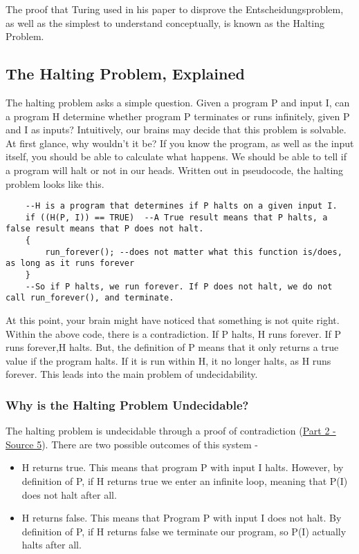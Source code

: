 \documentclass{article}
\begin{document}
    \medskip\noindent The proof that Turing used in his paper to disprove the Entscheidungsproblem, as well as the simplest to understand conceptually, is known as the Halting Problem. 
    
    \subsection{The Halting Problem, Explained}
    
    \medskip\noindent The halting problem asks a simple question. Given a program P and input I, can a program H determine whether program P terminates or runs infinitely, given P and I as inputs? Intuitively, our brains may decide that this problem is solvable. At first glance, why wouldn't it be? If you know the program, as well as the input itself, you should be able to calculate what happens. We should be able to tell if a program will halt or not in our heads. Written out in pseudocode, the halting problem looks like this.
    
    \begin{lstlisting}
    --H is a program that determines if P halts on a given input I. 
    if ((H(P, I)) == TRUE)  --A True result means that P halts, a false result means that P does not halt. 
    {
        run_forever(); --does not matter what this function is/does, as long as it runs forever 
    }
    --So if P halts, we run forever. If P does not halt, we do not call run_forever(), and terminate. 
    \end{lstlisting}
    
    \medskip\noindent At this point, your brain might have noticed that something is not quite right. Within the above code, there is a contradiction. If P halts, H runs forever. If P runs forever,H halts. But, the definition of P means that it only returns a true value if the program halts. If it is run within H, it no longer halts, as H runs forever. This leads into the main problem of undecidability. 
    
    \subsubsection{Why is the Halting Problem Undecidable?}
    The halting problem is undecidable through a proof of contradiction (\href {https://brilliant.org/wiki/halting-problem/}{Part 2 - Source 5}). There are two possible outcomes of this system - 
    \begin{itemize}
        \item H returns true. This means that program P with input I halts. However, by definition of P, if H returns true we enter an infinite loop, meaning that P(I) does not halt after all. 
        \item H returns false. This means that Program P with input I does not halt. By definition of P, if H returns false we terminate our program, so P(I) actually halts after all. 
    \end{itemize}
    
\end{document}
